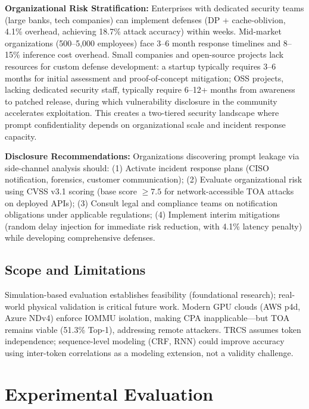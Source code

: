 \documentclass[conference,10pt,twocolumn]{IEEEtran}
\begin{document}
\textbf{Organizational Risk Stratification:}
Enterprises with dedicated security teams (large banks, tech companies) can implement
defenses (DP + cache-oblivion, 4.1\% overhead, achieving 18.7\% attack accuracy)
within weeks. Mid-market organizations (500--5,000 employees) face 3--6 month
response timelines and 8--15\% inference cost overhead. Small companies and open-source
projects lack resources for custom defense development: a startup typically requires
3--6 months for initial assessment and proof-of-concept mitigation; OSS projects,
lacking dedicated security staff, typically require 6--12+ months from awareness
to patched release, during which vulnerability disclosure in the community accelerates
exploitation. This creates a two-tiered security landscape where prompt confidentiality
depends on organizational scale and incident response capacity.

\textbf{Disclosure Recommendations:}
Organizations discovering prompt leakage via side-channel analysis should:
(1) Activate incident response plans (CISO notification, forensics, customer communication);
(2) Evaluate organizational risk using CVSS v3.1 scoring (base score $\geq 7.5$ for
network-accessible TOA attacks on deployed APIs); (3) Consult legal and compliance
teams on notification obligations under applicable regulations;
(4) Implement interim mitigations (random delay injection for immediate risk reduction,
with 4.1\% latency penalty) while developing comprehensive defenses.

\subsection{Scope and Limitations}

Simulation-based evaluation establishes feasibility (foundational research);
real-world physical validation is critical future work. Modern GPU clouds
(AWS p4d, Azure NDv4) enforce IOMMU isolation, making CPA inapplicable---but
TOA remains viable (51.3\% Top-1), addressing remote attackers. TRCS assumes
token independence; sequence-level modeling (CRF, RNN) could improve accuracy
using inter-token correlations as a modeling extension, not a validity challenge.

\section{Experimental Evaluation}
\label{sec:eval}
\end{document}
